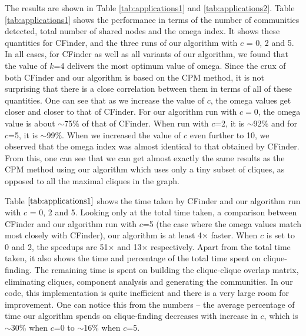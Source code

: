 



The results are shown in Table \ref{tab:applications1} and \ref{tab:applications2}. Table \ref{tab:applications1} shows the performance in terms of the number of communities detected, total number of shared nodes and the omega index. It shows these quantities for CFinder, and the three runs of our algorithm with $c$ = 0, 2 and 5. In all cases, for CFinder as well as all variants of our algorithm, we found that the value of $k$=4 delivers the most optimum value of omega. Since the crux of both CFinder and our algorithm is based on the CPM method, it is not surprising that there is a close correlation between them in terms of all of these quantities. One can see that as we increase the value of $c$, the omega values get closer and closer to that of CFinder. For our algorithm run with $c=0$, the omega value is about $\sim$75$\%$ of that of CFinder. When run with $c$=2, it is $\sim$92$\%$ and for $c$=5, it is $\sim$99$\%$. When we increased the value of $c$ even further to 10, we observed that the omega index was almost identical to that obtained by CFinder. From this, one can see that we can get almost exactly the same results as the CPM method using our algorithm which uses only a tiny subset of cliques, as opposed to all the maximal cliques in the graph.

Table $\ref{tab:applications1}$ shows the time taken by CFinder and our algorithm run with $c$ = 0, 2 and 5. Looking only at the total time taken, a comparison between CFinder and our algorithm run with $c$=5 (the case where the omega values match most closely with CFinder), our algorithm is at least 4$\times$ faster. When $c$ is set to 0 and 2, the speedups are 51$\times$ and 13$\times$ respectively. Apart from the total time taken, it also shows the time and percentage of the total time spent on clique-finding. The remaining time is spent on building the clique-clique overlap matrix, eliminating cliques, component analysis and generating the communities. In our code, this implementation is quite inefficient and there is a very large room for improvement. One can notice this from the numbers -- the average percentage of time our algorithm spends on clique-finding decreases with increase in $c$, which is $\sim$30$\%$ when $c$=0 to $\sim$16$\%$ when $c$=5.



